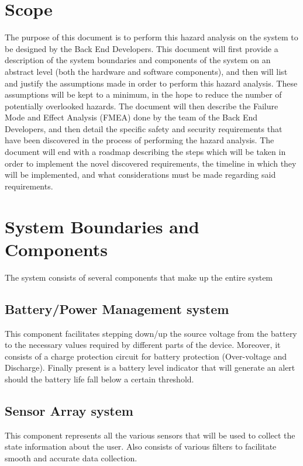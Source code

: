 \documentclass{article}
\begin{document}
\section{Scope}

The purpose of this document is to perform this hazard analysis on the system to be designed by the Back End Developers. This document will first provide a description of the system boundaries and components of the system on an abstract level (both the hardware and software components), and then will list and justify the assumptions made in order to perform this hazard analysis. These assumptions will be kept to a minimum, in the hope to reduce the number of potentially overlooked hazards. The document will then describe the Failure Mode and Effect Analysis (FMEA) done by the team of the Back End Developers, and then detail the specific safety and security requirements that have been discovered in the process of performing the hazard analysis. The document will end with a roadmap describing the steps which will be taken in order to implement the novel discovered requirements, the timeline in which they will be implemented, and what considerations must be made regarding said requirements.

\section{System Boundaries and Components}
The system consists of several components that make up the entire system

\subsection{\label{Battery_sec}Battery/Power Management system}
This component facilitates stepping down/up the source voltage from the battery to the necessary values required by different parts of the device. Moreover, it consists of a 										charge protection circuit for battery protection (Over-voltage and Discharge). Finally present is a battery level indicator that will generate an alert should the battery life fall below a certain threshold.

\subsection{\label{Sensor_sec}Sensor Array system}
This component represents all the various sensors that will be used to collect the state information about the user. Also consists of various filters to facilitate smooth and accurate data collection.
\end{document}
